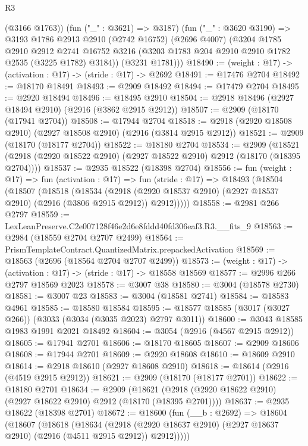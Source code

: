 \begin{lexlean}{R3}
\begin{coremodule}
        (@3166 @1763))
      (fun ("_" : @3621) => @3187)
      (fun ("_" : @3620 @3190) =>
      @3193
        @1786
        @2913
        @2910
        (@2742 @16752)
        (@2696 @4007)
        (@3204
          @1785
          @2910
          @2912
          @2741
          @16752
          @3216
          (@3203 @1783 @204 @2910 @2910 @1782 @2535 (@3225 @1782) @3184))
        (@3231 @1781)))
@18490 := (weight : @17) -> (activation : @17) -> (stride : @17) -> @2692
@18491 := @17476 @2704
@18492 := @18170 @18491
@18493 := @2909 @18492
@18494 := @17479 @2704
@18495 := @2920 @18494
@18496 := @18495 @2910
@18504 := @2918 @18496 (@2927 @18494 @2910) (@2916 (@3862 @2915 @2912))
@18507 := @2909 (@18170 (@17941 @2704))
@18508 := @17944 @2704
@18518 := @2918 (@2920 @18508 @2910) (@2927 @18508 @2910) (@2916 (@3814 @2915 @2912))
@18521 := @2909 (@18170 (@18177 @2704))
@18522 := @18180 @2704
@18534 := @2909
    (@18521 (@2918 (@2920 @18522 @2910) (@2927 @18522 @2910) @2912 (@18170 (@18395 @2704))))
@18537 := @2935 @18522 (@18398 @2704)
@18556 := fun (weight : @17) =>
  fun (activation : @17) =>
  fun (stride : @17) =>
  @18493
    (@18504
      (@18507
        (@18518
          (@18534
            (@2918 (@2920 @18537 @2910) (@2927 @18537 @2910) (@2916 (@3806 @2915 @2912)) @2912)))))
@18558 := @2981 @266 @2797
@18559 := LexLeanPreserve.C2e007128f46e2d6e8fddd40fd306eaf3.R3.__fits_9
@18563 := @2984 (@18559 @2704 @2707 @2499)
@18564 := PrismTemplateContract.QuantizedMatrix.prepackedActivation
@18569 := @18563 (@2696 (@18564 @2704 @2707 @2499))
@18573 := (weight : @17) -> (activation : @17) -> (stride : @17) -> @18558 @18569
@18577 := @2996 @266 @2797 @18569 @2023
@18578 := @3007 @38
@18580 := @3004 (@18578 @2730)
@18581 := @3007 @23
@18583 := @3004 (@18581 @2741)
@18584 := @18583 @4961
@18585 := @18580 @18584
@18595 := @18577 @18585 (@3017 (@3027 @266)) (@3033 (@3034 (@3035 @2023) @2797 @3011))
@18600 := @3043 @18585 @1983 @1991 @2021 @18492
@18604 := @3054 (@2916 (@4567 @2915 @2912))
@18605 := @17941 @2701
@18606 := @18170 @18605
@18607 := @2909 @18606
@18608 := @17944 @2701
@18609 := @2920 @18608
@18610 := @18609 @2910
@18614 := @2918 @18610 (@2927 @18608 @2910)
@18618 := @18614 (@2916 (@4519 @2915 @2912))
@18621 := @2909 (@18170 (@18177 @2701))
@18622 := @18180 @2701
@18634 := @2909
    (@18621 (@2918 (@2920 @18622 @2910) (@2927 @18622 @2910) @2912 (@18170 (@18395 @2701))))
@18637 := @2935 @18622 (@18398 @2701)
@18672 := @18600
    (fun (__b : @2692) =>
    @18604
      (@18607
        (@18618
          (@18634
            (@2918 (@2920 @18637 @2910) (@2927 @18637 @2910) (@2916 (@4511 @2915 @2912)) @2912)))))

\end{coremodule}
\end{lexlean}
